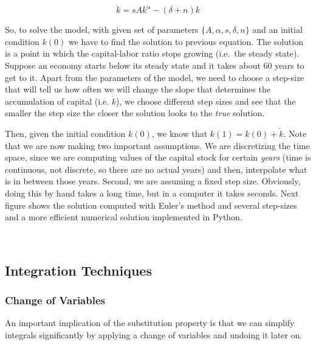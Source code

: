 \documentclass[11pt]{article}
\begin{document}
\[
\dot{k} = sAk^{\alpha} - (\delta + n)k
\]

So, to solve the model, with given set of parameters
\(\{A,\alpha,s,\delta,n\}\) and an initial condition \(k(0)\) we have to
find the solution to previous equation. The solution is a point in which
the capital-labor ratio stops growing (i.e.~the steady state). Suppose
an economy starts below its steady state and it takes about 60 years to
get to it. Apart from the parameters of the model, we need to choose a
step-size that will tell us how often we will change the slope that
determines the accumulation of capital (i.e. \(\dot{k}\)), we choose
different step sizes and see that the smaller the step size the closer
the solution looks to the \emph{true} solution.

Then, given the initial condition \(k(0)\), we know that
\(k(1) = k(0) + \dot{k}\). Note that we are now making two important
assumptions. We are discretizing the time space, since we are computing
values of the capital stock for certain \emph{years} (time is
continuous, not discrete, so there are no actual years) and then,
interpolate what is in between those years. Second, we are assuming a
fixed step size. Obviously, doing this by hand takes a long time, but in
a computer it takes seconds. Next figure shows the solution computed
with Euler's method and several step-sizes and a more efficient
numerical solution implemented in Python.

    \begin{center}
    \end{center}
    { \hspace*{\fill} \\}
    
    \hypertarget{integration-techniques}{%
\subsection{Integration Techniques}\label{integration-techniques}}

\hypertarget{change-of-variables}{%
\subsubsection{Change of Variables}\label{change-of-variables}}

An important implication of the substitution property is that we can
simplify integrals significantly by applying a change of variables and
undoing it later on.
\end{document}
